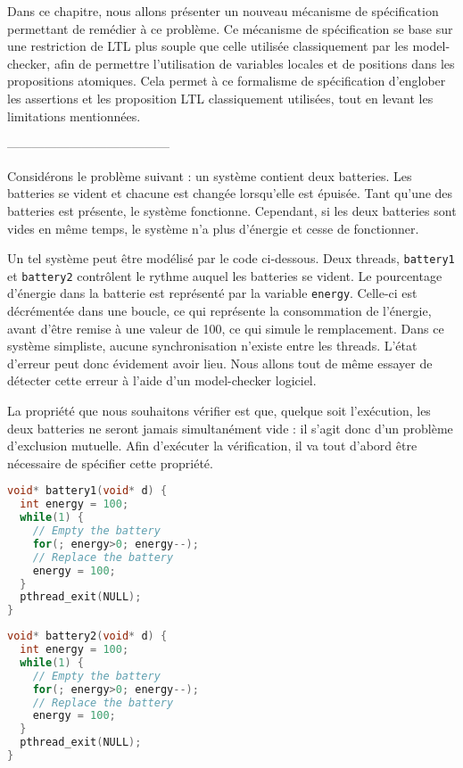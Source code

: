 Dans ce chapitre, nous allons présenter un nouveau mécanisme de spécification
permettant de remédier à ce problème. Ce mécanisme de spécification se base sur
une restriction de \ac{LTL} plus souple que celle utilisée classiquement par les
model-checker, afin de permettre l'utilisation de variables locales et de
positions dans les propositions atomiques. Cela permet à ce formalisme de
spécification d'englober les assertions et les proposition LTL classiquement
utilisées, tout en levant les limitations mentionnées.

---------------------------------------

Considérons le problème suivant : un système contient deux batteries. Les
batteries se vident et chacune est changée lorsqu'elle est épuisée. Tant qu'une
des batteries est présente, le système fonctionne. Cependant, si les deux
batteries sont vides en même temps, le système n'a plus d'énergie et cesse de
fonctionner.

Un tel système peut être modélisé par le code ci-dessous. Deux threads,
\texttt{battery1} et \texttt{battery2} contrôlent le rythme auquel les
batteries se vident. Le pourcentage d'énergie dans la batterie est représenté
par la variable \texttt{energy}. Celle-ci est décrémentée dans une
boucle, ce qui représente la consommation de l'énergie, avant d'être remise à
une valeur de 100, ce qui simule le remplacement. Dans ce système simpliste,
aucune synchronisation n'existe entre les threads. L'état d'erreur peut donc
évidement avoir lieu. Nous allons tout de même essayer de détecter cette erreur
à l'aide d'un model-checker logiciel.

La propriété que nous souhaitons vérifier est que, quelque soit
l'exécution, les deux batteries ne seront jamais simultanément vide : il
s'agit donc d'un problème d'exclusion mutuelle. Afin d'exécuter la
vérification, il va tout d'abord être nécessaire de spécifier cette
propriété.

\noindent\begin{minipage}{.45\textwidth}
\begin{lstlisting}[language=C, frame=single, caption=Thread 1]
void* battery1(void* d) {
  int energy = 100;
  while(1) {
    // Empty the battery
    for(; energy>0; energy--);
    // Replace the battery
    energy = 100;
  }
  pthread_exit(NULL);
}
\end{lstlisting}
\end{minipage}\hfill
\begin{minipage}{.45\textwidth}
\begin{lstlisting}[language=C, frame=single, caption=Thread 2]
void* battery2(void* d) {
  int energy = 100;
  while(1) {
    // Empty the battery
    for(; energy>0; energy--);
    // Replace the battery
    energy = 100;
  }
  pthread_exit(NULL);
}
\end{lstlisting}
\end{minipage}

